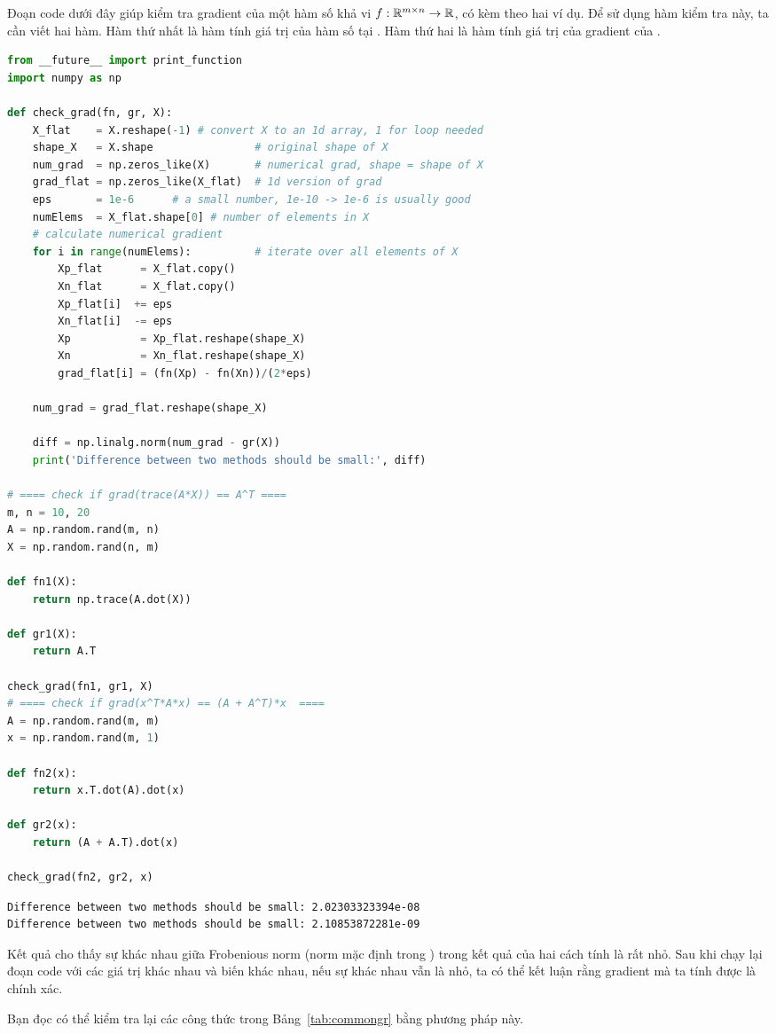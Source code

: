 Đoạn code dưới đây giúp kiểm tra gradient của một hàm số khả vi $f:
\mathbb{R}^{m \times n} \rightarrow \mathbb{R}$, có kèm theo hai ví dụ. Để sử dụng hàm kiểm tra
 này, ta cần viết hai hàm. Hàm thứ nhất là hàm
 tính giá trị của hàm số tại . Hàm thứ hai
là hàm  tính giá trị của gradient của .

\newpage

\begin{lstlisting}[language=Python]
from __future__ import print_function
import numpy as np

def check_grad(fn, gr, X):
    X_flat    = X.reshape(-1) # convert X to an 1d array, 1 for loop needed
    shape_X   = X.shape                # original shape of X
    num_grad  = np.zeros_like(X)       # numerical grad, shape = shape of X
    grad_flat = np.zeros_like(X_flat)  # 1d version of grad
    eps       = 1e-6      # a small number, 1e-10 -> 1e-6 is usually good
    numElems  = X_flat.shape[0] # number of elements in X
    # calculate numerical gradient
    for i in range(numElems):          # iterate over all elements of X
        Xp_flat      = X_flat.copy()
        Xn_flat      = X_flat.copy()
        Xp_flat[i]  += eps
        Xn_flat[i]  -= eps
        Xp           = Xp_flat.reshape(shape_X)
        Xn           = Xn_flat.reshape(shape_X)
        grad_flat[i] = (fn(Xp) - fn(Xn))/(2*eps)

    num_grad = grad_flat.reshape(shape_X)

    diff = np.linalg.norm(num_grad - gr(X))
    print('Difference between two methods should be small:', diff)

# ==== check if grad(trace(A*X)) == A^T ====
m, n = 10, 20
A = np.random.rand(m, n)
X = np.random.rand(n, m)

def fn1(X):
    return np.trace(A.dot(X))

def gr1(X):
    return A.T

check_grad(fn1, gr1, X)
# ==== check if grad(x^T*A*x) == (A + A^T)*x  ====
A = np.random.rand(m, m)
x = np.random.rand(m, 1)

def fn2(x):
    return x.T.dot(A).dot(x)

def gr2(x):
    return (A + A.T).dot(x)

check_grad(fn2, gr2, x)

\end{lstlisting}
\kq
\begin{lstlisting}
Difference between two methods should be small: 2.02303323394e-08
Difference between two methods should be small: 2.10853872281e-09
\end{lstlisting}

Kết quả cho thấy sự khác nhau giữa Frobenious norm (norm mặc định trong
) trong kết quả của hai cách tính là rất nhỏ. Sau
khi chạy lại đoạn code với các giá trị  khác nhau và biến
 khác nhau, nếu sự khác nhau vẫn là nhỏ, ta có thể kết luận rằng
gradient mà ta tính được là chính xác.

Bạn đọc có thể kiểm tra lại các công thức trong Bảng~\ref{tab:commongr} bằng
phương pháp này.



